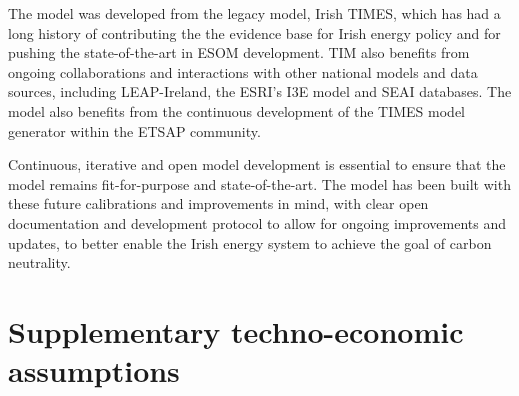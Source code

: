 \documentclass[gmd,manuscript]{copernicus}
\begin{document}
The model was developed from the legacy model, Irish TIMES, which has had a long history of contributing the the evidence base for Irish energy policy and for pushing the state-of-the-art in ESOM development. TIM also benefits from ongoing collaborations and interactions with other national models and data sources, including LEAP-Ireland, the ESRI's I3E model and SEAI databases. The model also benefits from the continuous development of the TIMES model generator within the ETSAP community.

Continuous, iterative and open model development is essential to ensure that the model remains fit-for-purpose and state-of-the-art. The model has been built with these future calibrations and improvements in mind, with clear open documentation and development protocol to allow for ongoing improvements and updates, to better enable the Irish energy system to achieve the goal of carbon neutrality. 













\clearpage


\appendix 
\section{Supplementary techno-economic assumptions}
\label{s:Appendix-data}
\end{document}
